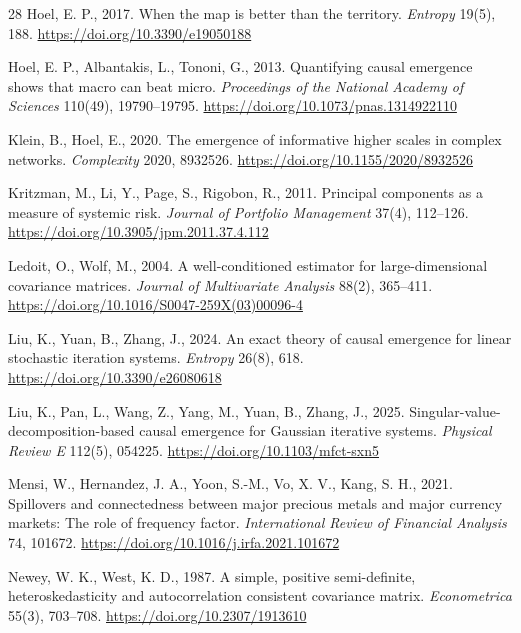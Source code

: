 \documentclass[review,12pt,authoryear]{elsarticle}
\begin{document}
\begin{thebibliography}{28}
Hoel, E. P., 2017.
\newblock When the map is better than the territory.
\newblock \emph{Entropy} 19(5), 188. \url{https://doi.org/10.3390/e19050188}

Hoel, E. P., Albantakis, L., Tononi, G., 2013.
\newblock Quantifying causal emergence shows that macro can beat micro.
\newblock \emph{Proceedings of the National Academy of Sciences} 110(49), 19790--19795. \url{https://doi.org/10.1073/pnas.1314922110}

Klein, B., Hoel, E., 2020.
\newblock The emergence of informative higher scales in complex networks.
\newblock \emph{Complexity} 2020, 8932526. \url{https://doi.org/10.1155/2020/8932526}

Kritzman, M., Li, Y., Page, S., Rigobon, R., 2011.
\newblock Principal components as a measure of systemic risk.
\newblock \emph{Journal of Portfolio Management} 37(4), 112--126. \url{https://doi.org/10.3905/jpm.2011.37.4.112}

Ledoit, O., Wolf, M., 2004.
\newblock A well-conditioned estimator for large-dimensional covariance matrices.
\newblock \emph{Journal of Multivariate Analysis} 88(2), 365--411. \url{https://doi.org/10.1016/S0047-259X(03)00096-4}

Liu, K., Yuan, B., Zhang, J., 2024.
\newblock An exact theory of causal emergence for linear stochastic iteration systems.
\newblock \emph{Entropy} 26(8), 618. \url{https://doi.org/10.3390/e26080618}

Liu, K., Pan, L., Wang, Z., Yang, M., Yuan, B., Zhang, J., 2025.
\newblock Singular-value-decomposition-based causal emergence for Gaussian iterative systems.
\newblock \emph{Physical Review E} 112(5), 054225. \url{https://doi.org/10.1103/mfct-sxn5}

Mensi, W., Hernandez, J. A., Yoon, S.-M., Vo, X. V., Kang, S. H., 2021.
\newblock Spillovers and connectedness between major precious metals and major currency markets: The role of frequency factor.
\newblock \emph{International Review of Financial Analysis} 74, 101672. \url{https://doi.org/10.1016/j.irfa.2021.101672}

Newey, W. K., West, K. D., 1987.
\newblock A simple, positive semi-definite, heteroskedasticity and autocorrelation consistent covariance matrix.
\newblock \emph{Econometrica} 55(3), 703--708. \url{https://doi.org/10.2307/1913610}


\end{thebibliography}
\end{document}
